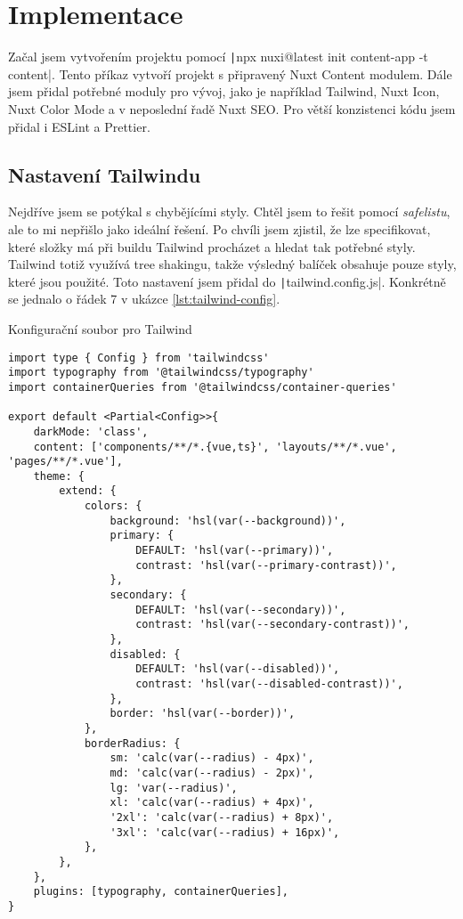
\chapter{Implementace}

Začal jsem vytvořením projektu pomocí \texttt|npx nuxi@latest init content-app -t content|. Tento příkaz vytvoří
projekt s připravený Nuxt Content modulem. Dále jsem přidal potřebné moduly pro vývoj, jako je například Tailwind, Nuxt Icon,
Nuxt Color Mode a v neposlední řadě Nuxt SEO. Pro větší konzistenci kódu jsem přidal i ESLint a Prettier.

\clearpage

\section{Nastavení Tailwindu}

Nejdříve jsem se potýkal s chybějícími styly. Chtěl jsem to řešit pomocí \emph{safelistu}, ale to mi nepřišlo jako ideální řešení.
Po chvíli jsem zjistil, že lze specifikovat, které složky má při buildu Tailwind procházet a hledat tak potřebné styly. Tailwind totiž
využívá tree shakingu, takže výsledný balíček obsahuje pouze styly, které jsou použité. Toto nastavení jsem přidal do \texttt|tailwind.config.js|.
Konkrétně se jednalo o řádek 7 v ukázce \ref{lst:tailwind-config}.

\begin{listing}[h]
    \caption{Konfigurační soubor pro Tailwind}
    \label{lst:tailwind-config}
    \begin{verbatim}
import type { Config } from 'tailwindcss'
import typography from '@tailwindcss/typography'
import containerQueries from '@tailwindcss/container-queries'

export default <Partial<Config>>{
    darkMode: 'class',
    content: ['components/**/*.{vue,ts}', 'layouts/**/*.vue', 'pages/**/*.vue'],
    theme: {
        extend: {
            colors: {
                background: 'hsl(var(--background))',
                primary: {
                    DEFAULT: 'hsl(var(--primary))',
                    contrast: 'hsl(var(--primary-contrast))',
                },
                secondary: {
                    DEFAULT: 'hsl(var(--secondary))',
                    contrast: 'hsl(var(--secondary-contrast))',
                },
                disabled: {
                    DEFAULT: 'hsl(var(--disabled))',
                    contrast: 'hsl(var(--disabled-contrast))',
                },
                border: 'hsl(var(--border))',
            },
            borderRadius: {
                sm: 'calc(var(--radius) - 4px)',
                md: 'calc(var(--radius) - 2px)',
                lg: 'var(--radius)',
                xl: 'calc(var(--radius) + 4px)',
                '2xl': 'calc(var(--radius) + 8px)',
                '3xl': 'calc(var(--radius) + 16px)',
            },
        },
    },
    plugins: [typography, containerQueries],
}
    \end{verbatim}
\end{listing}

